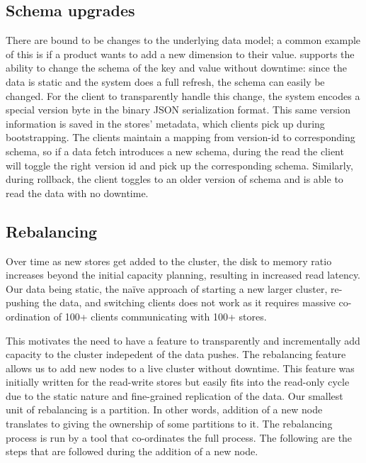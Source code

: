 
\subsection{Schema upgrades}
\label{sec:read_only:data_cycle:schema_upgrades}

There are bound to be changes to the underlying data model; a common
example of this is if a product wants to add a new dimension to their
value. \projectname{} supports the ability to change the schema of the
key and value without downtime: since the data is static and the
system does a full refresh, the schema can easily be changed. For the
client to transparently handle this change, the system encodes a
special version byte in the binary JSON serialization format. This
same version information is saved in the stores' metadata, which
clients pick up during bootstrapping. The clients maintain a mapping
from version-id to corresponding schema, so if a data fetch introduces
a new schema, during the read the client will toggle the right version
id and pick up the corresponding schema. Similarly, during rollback,
the client toggles to an older version of schema and is able to read
the data with no downtime. 


\subsection{Rebalancing}
\label{sec:read_only:data_cycle:rebalancing}

Over time as new stores get added to the cluster, the disk to memory
ratio increases beyond the initial capacity planning, resulting in
increased read latency. Our data being static, the na\"{i}ve
approach of starting a new larger cluster, re-pushing the data, and
switching clients does not work as it requires massive co-ordination
of 100+ clients communicating with 100+ stores.

This motivates the need to have a feature to transparently and 
incrementally add capacity to the cluster indepedent of the data pushes. 
The rebalancing feature allows us to add new nodes to a live cluster without 
downtime. This feature was initially written for the read-write stores 
but easily fits into the read-only cycle due to the static nature 
and fine-grained replication of the data. Our smallest unit of rebalancing 
is a partition. In other words, addition of a new node translates to giving the ownership 
of some partitions to it. The rebalancing process is run by a tool that 
co-ordinates the full process. The following are the steps that
are followed during the addition of a new node. 

